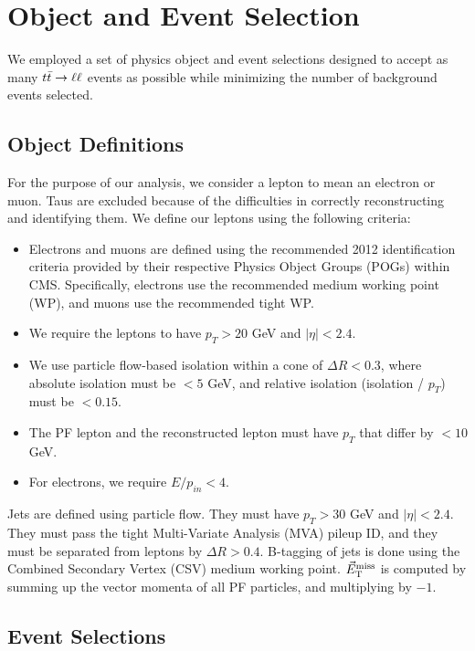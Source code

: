 \section{Object and Event Selection}
\label{sec:afb:selections}

We employed a set of physics object and event selections designed to
accept as many $t\bar{t} \rightarrow \ell\ell$ events as possible while minimizing the
number of background events selected.

\subsection{Object Definitions}
\label{ssec:afb:objdefs}

For the purpose of our analysis, we consider a lepton to mean an
electron or muon. Taus are excluded because of the difficulties in
correctly reconstructing and identifying them. We define our leptons
using the following criteria:

\begin{itemize}
\item Electrons and muons are defined using the recommended
  2012 identification criteria provided by their respective Physics Object
  Groups (POGs) within CMS. Specifically, electrons use the
  recommended medium working point (WP), and muons use the recommended
  tight WP.
\item We require the leptons to have $p_T > 20$ GeV and $|\eta| < 2.4$.
\item We use particle flow-based isolation within a cone of $\Delta R
  < 0.3$, where absolute isolation must be $< 5$ GeV, and relative
  isolation (isolation / $p_T$) must be $< 0.15$. %
\item The PF lepton and the reconstructed lepton must have $p_T$ that
  differ by $< 10$ GeV.
\item For electrons, we require $E / p_{in} < 4$. %
\end{itemize}

Jets are defined using particle flow. They must have $p_T > 30$ GeV
and $|\eta| < 2.4$. They must pass the tight Multi-Variate Analysis
(MVA) pileup ID, and they must be separated from leptons by $\Delta R
> 0.4$. B-tagging of jets is done using the Combined Secondary Vertex
(CSV) medium working point. $\vec{E}_\text{T}^\text{miss}$ is computed by summing up the vector
momenta of all PF particles, and multiplying by $-1$.

\subsection{Event Selections}
\label{ssec:afb:eventsel}

